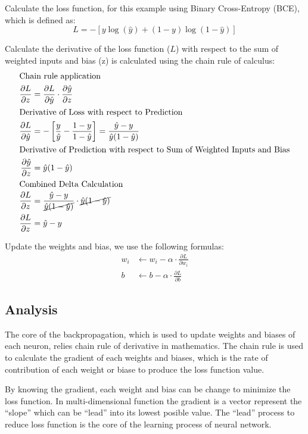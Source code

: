 \documentclass[a4paper,10pt]{article}
\begin{document}
Calculate the loss function, for this example using Binary Cross-Entropy (BCE), which is defined as:
\begin{equation}\label{eq:bce_loss}
    L = -\left[ y \log(\hat{y}) + (1 - y) \log(1 - \hat{y}) \right]
\end{equation}

Calculate the derivative of the loss function ($L$) with respect to the sum of weighted inputs and bias (z) is calculated using the chain rule of calculus:
\begin{align}\label{eq:chain_rule}
\intertext{Chain rule application}
    \frac{\partial L}{\partial z} &= \frac{\partial L}{\partial \hat{y}} \cdot \frac{\partial \hat{y}}{\partial z} \\
\intertext{Derivative of Loss with respect to Prediction}
    \frac{\partial L}{\partial \hat{y}} &= -\left[ \frac{y}{\hat{y}} - \frac{1-y}{1-\hat{y}} \right] = \frac{\hat{y} - y}{\hat{y}(1-\hat{y})} \\
\intertext{Derivative of Prediction with respect to Sum of Weighted Inputs and Bias}
    \frac{\partial \hat{y}}{\partial z} &= \hat{y}(1 - \hat{y}) \\
\intertext{Combined Delta Calculation}
    \frac{\partial L}{\partial z} &= \frac{\hat{y} - y}{\cancel{\hat{y}(1-\hat{y})}} \cdot \cancel{\hat{y}(1 - \hat{y})} \nonumber \\
    \frac{\partial L}{\partial z} &= \hat{y} - y
\end{align}

\noindent
Update the weights and bias, we use the following formulas:
\begin{align}\label{eq:update_weights_bias}
    w_i &\leftarrow w_i - \alpha \cdot \frac{\partial L}{\partial w_i} \\
    b &\leftarrow b - \alpha \cdot \frac{\partial L}{\partial b}
\end{align}

\subsection{Analysis}
The core of the backpropagation, which is used to update weights and biases of each neuron, relies chain rule of derivative in mathematics.
The chain rule is used to calculate the gradient of each weights and biases, which is the rate of contribution of each weight or biase to produce the loss function value.

By knowing the gradient, each weight and bias can be change to minimize the loss function.
In multi-dimensional function the gradient is a vector represent the ``slope'' which can be ``lead'' into its lowest posible value.
The ``lead'' process to reduce loss function is the core of the learning process of neural network.
\end{document}
